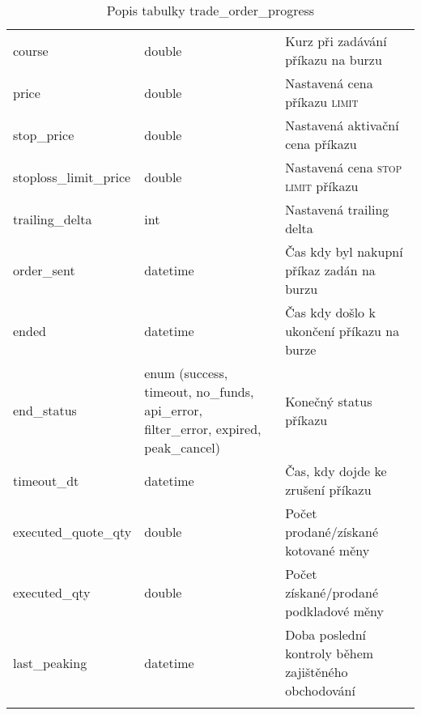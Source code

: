\begin{center}
\begin{longtable}[t]{|l|C{4cm}|p{4cm}|}
        course                      & double                                                                               & Kurz při zadávání příkazu na burzu                   \\
        price                       & double                                                                               & Nastavená cena příkazu \textsc{limit}                \\
        stop\_price                 & double                                                                               & Nastavená aktivační cena příkazu                     \\
        stoploss\_limit\_price      & double                                                                               & Nastavená cena \textsc{stop limit} příkazu           \\
        trailing\_delta             & int                                                                                  & Nastavená trailing delta                             \\
        order\_sent                 & datetime                                                                             & Čas kdy byl nakupní příkaz zadán na burzu            \\
        ended                       & datetime                                                                             & Čas kdy došlo k ukončení příkazu na burze            \\
        end\_status                 & enum (success, timeout, no\_funds, api\_error, filter\_error, expired, peak\_cancel) & Konečný status příkazu                               \\
        timeout\_dt                 & datetime                                                                             & Čas, kdy dojde ke zrušení příkazu                    \\
        executed\_quote\_qty        & double                                                                               & Počet prodané/získané kotované měny                  \\
        executed\_qty               & double                                                                               & Počet získané/prodané podkladové měny                \\
        last\_peaking               & datetime                                                                             & Doba poslední kontroly během zajištěného obchodování \\
        \hline
        \caption*{Popis tabulky trade\_order\_progress}
        \label{tab:tradeOrderProgress}
    \end{longtable}
\end{center}
\endinput

